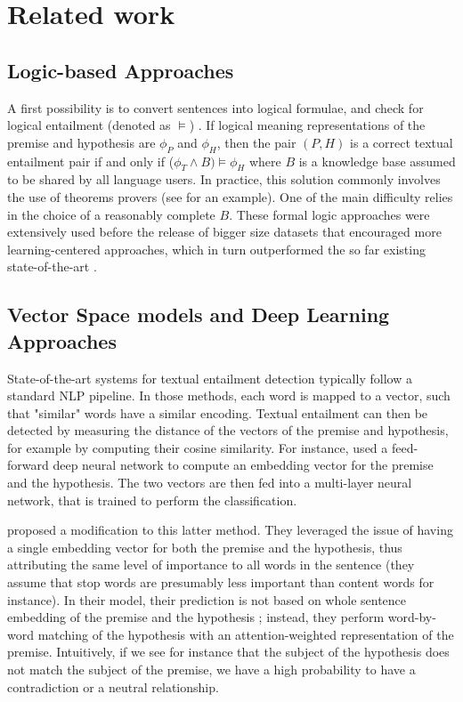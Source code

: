 \documentclass[final]{cvpr}
\begin{document}
\section{Related work}

\subsection{Logic-based Approaches}

A first possibility is to convert sentences into logical formulae, and check for logical entailment (denoted as $\models$) \cite{Rocha2018}. If logical meaning representations of the premise and hypothesis are $\phi_P$ and $\phi_H$, then the pair $(P,H)$ is a correct textual entailment pair if and only if ($\phi_T \wedge B) \models \phi_H$ where $B$ is a knowledge base assumed to be shared by all language users. In practice, this solution commonly involves the use of theorems provers (see \cite{Tatu2006} for an example). One of the main difficulty relies in the choice of a reasonably complete $B$. These formal logic approaches were extensively used before the release of bigger size datasets that encouraged more learning-centered approaches, which in turn outperformed the so far existing state-of-the-art \cite{jiang2015}.

\subsection{Vector Space models and Deep Learning Approaches}

State-of-the-art systems for textual entailment detection typically follow a standard NLP pipeline. In those methods, each word is mapped to a vector, such that "similar" words have a similar encoding. Textual entailment can then be detected by measuring the distance of the vectors of the premise and hypothesis, for example by computing their cosine similarity. For instance, \cite{bowman2015} used a feed-forward deep neural network to compute an embedding vector for the premise and the hypothesis. The two vectors are then fed into a multi-layer neural network, that is trained to perform the classification. 

\cite{jiang2015} proposed a modification to this latter method. They leveraged the issue of having a single embedding vector for both the premise and the hypothesis, thus attributing the same level of importance to all words in the sentence (they assume that stop words are presumably less important than content words for instance). In their model, their prediction is not based on whole sentence embedding of the premise and the hypothesis ; instead, they perform word-by-word matching of the hypothesis with an attention-weighted representation of the premise. Intuitively, if we see for instance that the subject of the hypothesis does not match the subject of the premise, we have a high probability to have a contradiction or a neutral relationship.
\end{document}
